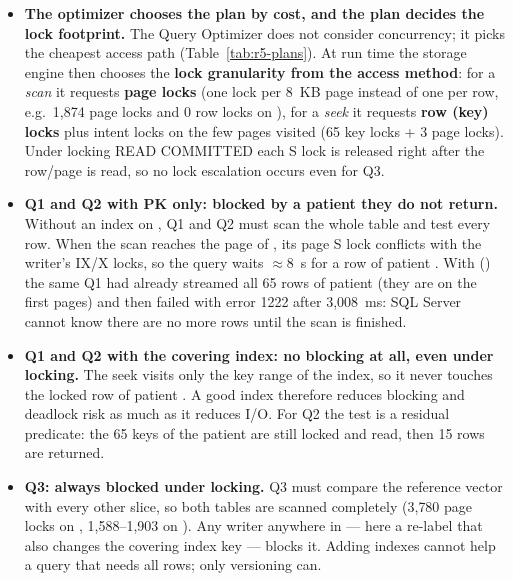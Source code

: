 \begin{itemize}
  \item \textbf{The optimizer chooses the plan by cost, and the plan decides the lock footprint.} The Query Optimizer does not consider concurrency; it picks the cheapest access path (Table~\ref{tab:r5-plans}). At run time the storage engine then chooses the \textbf{lock granularity from the access method}: for a \emph{scan} it requests \textbf{page locks} (one lock per 8~KB page instead of one per row, e.g.\ 1{,}874 page locks and 0 row locks on ), for a \emph{seek} it requests \textbf{row (key) locks} plus intent locks on the few pages visited (65 key locks + 3 page locks). Under locking READ COMMITTED each S lock is released right after the row/page is read, so no lock escalation occurs even for Q3.

  \item \textbf{Q1 and Q2 with PK only: blocked by a patient they do not return.} Without an index on , Q1 and Q2 must scan the whole table and test every row. When the scan reaches the page of , its page S lock conflicts with the writer's IX/X locks, so the query waits $\approx$8~s for a row of patient . With  () the same Q1 had already streamed all 65 rows of patient  (they are on the first pages) and then failed with error 1222 after 3{,}008~ms: SQL Server cannot know there are no more  rows until the scan is finished.

  \item \textbf{Q1 and Q2 with the covering index: no blocking at all, even under locking.} The seek visits only the key range  of the index, so it never touches the locked row of patient . A good index therefore reduces blocking and deadlock risk as much as it reduces I/O. For Q2 the  test is a residual predicate: the 65 keys of the patient are still locked and read, then 15 rows are returned.

  \item \textbf{Q3: always blocked under locking.} Q3 must compare the reference vector with every other slice, so both tables are scanned completely (3{,}780 page locks on , 1{,}588--1{,}903 on ). Any writer anywhere in  --- here a re-label that also changes the covering index key --- blocks it. Adding indexes cannot help a query that needs all rows; only versioning can.


\end{itemize}
